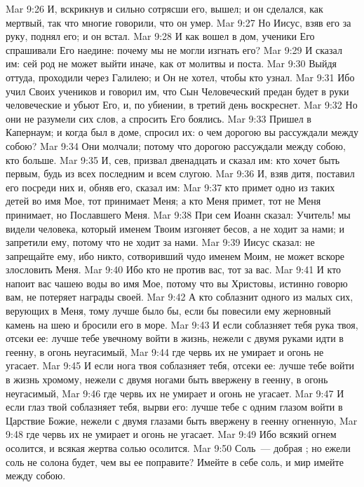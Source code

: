 \vs Mar 9:26 И, вскрикнув и сильно сотрясши его, вышел; и он сделался, как мертвый, так что многие говорили, что он умер.
\vs Mar 9:27 Но Иисус, взяв его за руку, поднял его; и он встал.
\vs Mar 9:28 И как вошел  в дом, ученики Его спрашивали Его наедине: почему мы не могли изгнать его?
\vs Mar 9:29 И сказал им: сей род не может выйти иначе, как от молитвы и поста.
\rsbpar\vs Mar 9:30 Выйдя оттуда, проходили через Галилею; и Он не хотел, чтобы кто узнал.
\vs Mar 9:31 Ибо учил Своих учеников и говорил им, что Сын Человеческий предан будет в руки человеческие и убьют Его, и, по убиении, в третий день воскреснет.
\vs Mar 9:32 Но они не разумели сих слов, а спросить Его боялись.
\rsbpar\vs Mar 9:33 Пришел в Капернаум; и когда был в доме, спросил их: о чем дорогою вы рассуждали между собою?
\vs Mar 9:34 Они молчали; потому что дорогою рассуждали между собою, кто больше.
\vs Mar 9:35 И, сев, призвал двенадцать и сказал им: кто хочет быть первым, будь из всех последним и всем слугою.
\vs Mar 9:36 И, взяв дитя, поставил его посреди них и, обняв его, сказал им:
\vs Mar 9:37 кто примет одно из таких детей во имя Мое, тот принимает Меня; а кто Меня примет, тот не Меня принимает, но Пославшего Меня.
\vs Mar 9:38 При сем Иоанн сказал: Учитель! мы видели человека, который именем Твоим изгоняет бесов, а не ходит за нами; и запретили ему, потому что не ходит за нами.
\vs Mar 9:39 Иисус сказал: не запрещайте ему, ибо никто, сотворивший чудо именем Моим, не может вскоре злословить Меня.
\vs Mar 9:40 Ибо кто не против вас, тот за вас.
\vs Mar 9:41 И кто напоит вас чашею воды во имя Мое, потому что вы Христовы, истинно говорю вам, не потеряет награды своей.
\vs Mar 9:42 А кто соблазнит одного из малых сих, верующих в Меня, тому лучше было бы, если бы повесили ему жерновный камень на шею и бросили его в море.
\vs Mar 9:43 И если соблазняет тебя рука твоя, отсеки ее: лучше тебе увечному войти в жизнь, нежели с двумя руками идти в геенну, в огонь неугасимый,
\vs Mar 9:44 где червь их не умирает и огонь не угасает.
\vs Mar 9:45 И если нога твоя соблазняет тебя, отсеки ее: лучше тебе войти в жизнь хромому, нежели с двумя ногами быть ввержену в геенну, в огонь неугасимый,
\vs Mar 9:46 где червь их не умирает и огонь не угасает.
\vs Mar 9:47 И если глаз твой соблазняет тебя, вырви его: лучше тебе с одним глазом войти в Царствие Божие, нежели с двумя глазами быть ввержену в геенну огненную,
\vs Mar 9:48 где червь их не умирает и огонь не угасает.
\vs Mar 9:49 Ибо всякий огнем осолится, и всякая жертва солью осолится.
\vs Mar 9:50 Соль~--- добрая ; но ежели соль не солона будет, чем вы ее поправите? Имейте в себе соль, и мир имейте между собою.
